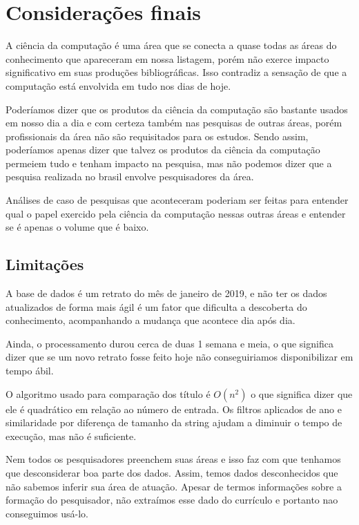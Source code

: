 \chapter{Considerações finais}

A ciência da computação é uma área que se conecta a quase todas as áreas do conhecimento que apareceram em nossa listagem, porém não exerce impacto significativo em suas produções bibliográficas. Isso contradiz a sensação de que a computação está envolvida em tudo nos dias de hoje.

Poderíamos dizer que os produtos da ciência da computação são bastante usados em nosso dia a dia e com certeza também nas pesquisas de outras áreas, porém profissionais da área não são requisitados para os estudos. Sendo assim, poderíamos apenas dizer que talvez os produtos da ciência da computação permeiem tudo e tenham impacto na pesquisa, mas não podemos dizer que a pesquisa realizada no brasil envolve pesquisadores da área.

Análises de caso de pesquisas que aconteceram poderiam ser feitas para entender qual o papel exercido pela ciência da computação nessas outras áreas e entender se é apenas o volume que é baixo.

\section{Limitações}

A base de dados é um retrato do mês de janeiro de 2019, e não ter os dados atualizados de forma mais ágil é um fator que dificulta a descoberta do conhecimento, acompanhando a mudança que acontece dia após dia.

Ainda, o processamento durou cerca de duas 1 semana e meia, o que significa dizer que se um novo retrato fosse feito hoje não conseguiriamos disponibilizar em tempo ábil.

O algoritmo usado para comparação dos título é $O(n^2)$ o que significa dizer que ele é quadrático em relação ao número de entrada. Os filtros aplicados de ano e similaridade por diferença de tamanho da string ajudam a diminuir o tempo de execução, mas não é suficiente.

Nem todos os pesquisadores preenchem suas áreas e isso faz com que tenhamos que desconsiderar boa parte dos dados. Assim, temos dados desconhecidos que não sabemos inferir sua área de atuação. Apesar de termos informações sobre a formação do pesquisador, não extraímos esse dado do currículo e portanto nao conseguimos usá-lo.

